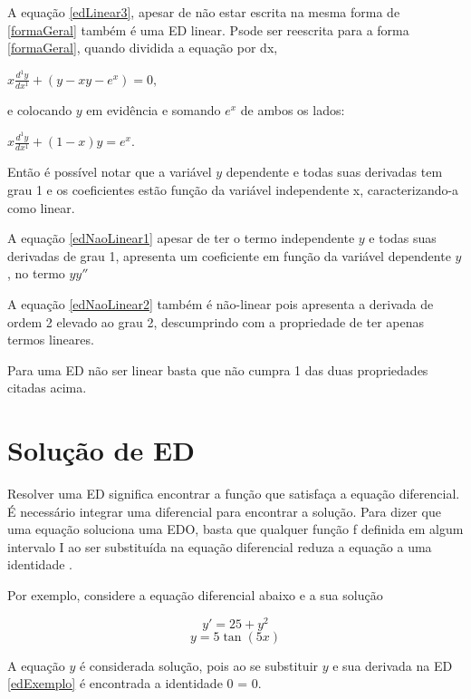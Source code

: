 A equação \ref{edLinear3}, apesar de não estar escrita na mesma forma de \ref{formaGeral} também é uma ED linear. Psode ser reescrita para a forma \ref{formaGeral}, quando dividida a equação por dx,
\begin{center}
$ x\frac{d^1y}{dx^1} + (y - xy - e^x) = 0, $ 
\end{center}
e colocando $y$ em evidência e somando $e^x$ de ambos os lados:
\begin{center}
$ x \frac{d^1y}{dx^1} + (1 - x)y =  e^x. $
\end{center}

Então é possível notar que a variável $y$ dependente e todas suas derivadas tem grau 1 e os coeficientes estão função da variável independente x, caracterizando-a como linear.

A equação \ref{edNaoLinear1} apesar de ter o termo independente $y$ e todas suas derivadas de grau 1, apresenta um coeficiente em função da variável dependente $y$, no termo $ yy''$

A equação \ref{edNaoLinear2} também é não-linear pois apresenta a derivada de ordem 2 elevado ao grau 2, descumprindo com a propriedade de ter apenas termos lineares.


Para uma ED não ser linear basta que não cumpra 1 das duas propriedades citadas acima.

\section[Solução de ED]{Solução de ED}

Resolver uma ED significa encontrar a função que satisfaça a equação diferencial. É necessário integrar uma diferencial para encontrar a solução.
Para dizer que uma equação soluciona uma EDO, basta que qualquer função f definida em algum intervalo I ao ser substituída na equação diferencial reduza a equação a uma identidade \cite{explicacaoEDO}.


Por exemplo, considere a equação diferencial abaixo e a sua solução 


\begin{equation} \label{edExemplo} y' = 25 + y^2 \end{equation}  \begin{equation} y = 5\tan(5x) \end{equation} 

\indent A equação $y$ é considerada solução, pois ao se substituir $y$ e sua derivada na ED \ref{edExemplo} é encontrada a identidade 0 = 0.

